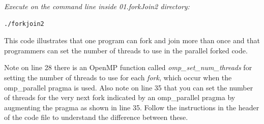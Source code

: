 \documentclass[letterpaper,10pt,openany,oneside]{sphinxmanual}
\begin{document}
\emph{Execute on the command line inside 01.forkJoin2 directory:}

\begin{Verbatim}[commandchars=\\\{\}]
./forkjoin2
\end{Verbatim}

This code illustrates that one program can fork and join more than once
and that programmers can set the number of threads to use in the parallel forked code.

Note on line 28 there is an OpenMP function called \emph{omp\_set\_num\_threads}
for setting the number of threads to use for each
\emph{fork}, which occur when the omp\_parallel pragma is used.
Also note on line 35 that you can set the number of threads for the very next
fork indicated by an omp\_parallel pragma by augmenting the pragma as shown in line 35.
Follow the instructions in the header of the code file to understand the difference
between these.
\end{document}
